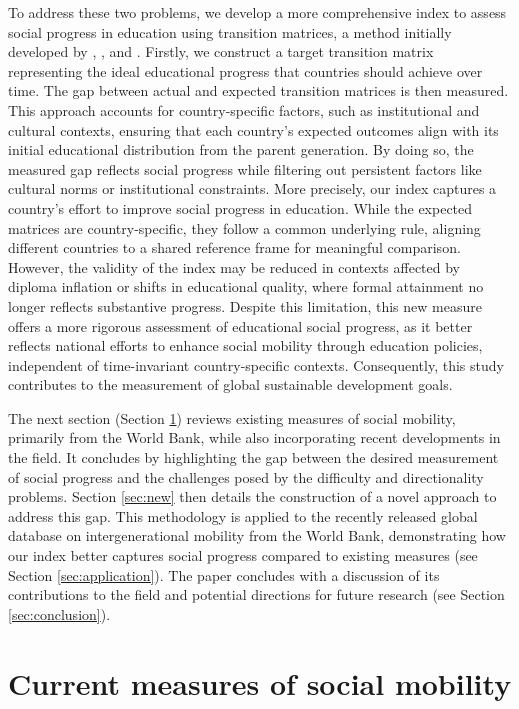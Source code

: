 To address these two problems, we develop a more comprehensive index to assess social progress in education using transition matrices, a method initially developed by \citet{prais1955measuring}, \citet{bibby1975methods}, and \citet{Bartholomew1967}. Firstly, we construct a target transition matrix representing the ideal educational progress that countries should achieve over time. The gap between actual and expected transition matrices is then measured. This approach accounts for country-specific factors, such as institutional and cultural contexts, ensuring that each country’s expected outcomes align with its initial educational distribution from the parent generation. By doing so, the measured gap reflects social progress while filtering out persistent factors like cultural norms or institutional constraints. More precisely, our index captures a country’s effort to improve social progress in education. While the expected matrices are country-specific, they follow a common underlying rule, aligning different countries to a shared reference frame for meaningful comparison. However, the validity of the index may be reduced in contexts affected by diploma inflation or shifts in educational quality, where formal attainment no longer reflects substantive progress. Despite this limitation, this new measure offers a more rigorous assessment of educational social progress, as it better reflects national efforts to enhance social mobility through education policies, independent of time-invariant country-specific contexts. Consequently, this study contributes to the measurement of global sustainable development goals.

The next section (Section \ref{sec:current}) reviews existing measures of social mobility, primarily from the World Bank, while also incorporating recent developments in the field. It concludes by highlighting the gap between the desired measurement of social progress and the challenges posed by the difficulty and directionality problems. Section \ref{sec:new} then details the construction of a novel approach to address this gap. This methodology is applied to the recently released global database on intergenerational mobility from the World Bank, demonstrating how our index better captures social progress compared to existing measures (see Section \ref{sec:application}). The paper concludes with a discussion of its contributions to the field and potential directions for future research (see Section \ref{sec:conclusion}).



\section{Current measures of social mobility} \label{sec:current}

